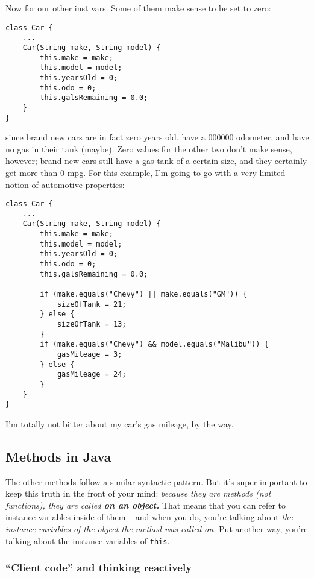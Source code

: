 Now for our other inst vars. Some of them make sense to be set to zero:

\begin{Verbatim}[samepage=true,fontsize=\scriptsize,frame=single]
class Car {
    ...
    Car(String make, String model) {
        this.make = make;
        this.model = model;
        this.yearsOld = 0;
        this.odo = 0;
        this.galsRemaining = 0.0;
    }
}
\end{Verbatim}

since brand new cars are in fact zero years old, have a 000000 odometer, and
have no gas in their tank (maybe). Zero values for the other two don't make
sense, however; brand new cars still have a gas tank of a certain size, and
they certainly get more than 0 mpg. For this example, I'm going to go with a
very limited notion of automotive properties:

\begin{Verbatim}[samepage=true,fontsize=\scriptsize,frame=single]
class Car {
    ...
    Car(String make, String model) {
        this.make = make;
        this.model = model;
        this.yearsOld = 0;
        this.odo = 0;
        this.galsRemaining = 0.0;
        
        if (make.equals("Chevy") || make.equals("GM")) {
            sizeOfTank = 21;
        } else {
            sizeOfTank = 13;
        }
        if (make.equals("Chevy") && model.equals("Malibu")) {
            gasMileage = 3;
        } else {
            gasMileage = 24;
        }
    }
}
\end{Verbatim}

I'm totally not bitter about my car's gas mileage, by the way.

\subsection{Methods in Java}

The other methods follow a similar syntactic pattern. But it's super important
to keep this truth in the front of your mind: \textit{because they are methods
(not functions), they are called \textbf{on an object.}} That means that
you can refer to instance variables inside of them -- and when you do, you're
talking about \textit{the instance variables of the object the method was
called on.} Put another way, you're talking about the instance variables of
\texttt{this}.

\subsubsection{``Client code'' and thinking reactively}

